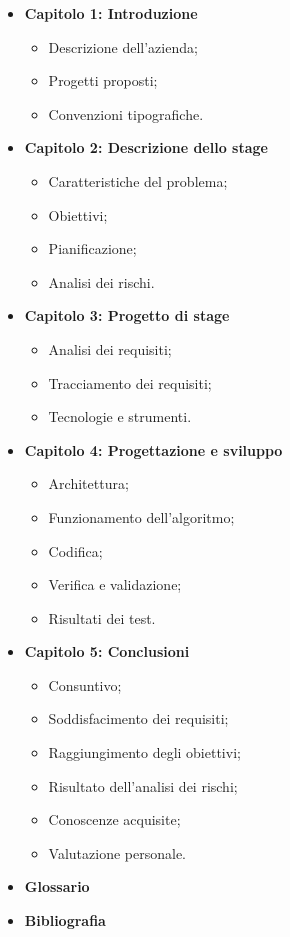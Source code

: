 \documentclass{report}
\begin{document}
	
\begin{itemize}
\item \textbf{Capitolo 1: Introduzione}
\begin{itemize}
	\item Descrizione dell'azienda;
	\item Progetti proposti;
	\item Convenzioni tipografiche.
\end{itemize}

\item \textbf{Capitolo 2: Descrizione dello stage }
\begin{itemize}
	\item Caratteristiche del problema;
	\item Obiettivi;
	\item Pianificazione;
	\item Analisi dei rischi.
\end{itemize}

\item \textbf{Capitolo 3: Progetto di stage}
\begin{itemize}
	\item Analisi dei requisiti;
	\item Tracciamento dei requisiti;
	\item Tecnologie e strumenti.
\end{itemize}

\item \textbf{Capitolo 4: Progettazione e sviluppo}
\begin{itemize}
	\item Architettura;
	\item Funzionamento dell'algoritmo;
	\item Codifica;
	\item Verifica e validazione;
	\item Risultati dei test.
\end{itemize}

\item \textbf{Capitolo 5: Conclusioni}
\begin{itemize}
	\item Consuntivo;
	\item Soddisfacimento dei requisiti;
	\item Raggiungimento degli obiettivi;
	\item Risultato dell'analisi dei rischi;
	\item Conoscenze acquisite;
	\item Valutazione personale.
\end{itemize}

\item \textbf{Glossario}
\item \textbf{Bibliografia}

\end{itemize}
\end{document}
